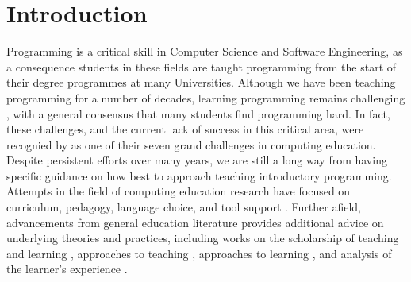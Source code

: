 
\chapter{Introduction} %
\label{cha:introduction}


Programming is a critical skill in Computer Science and Software Engineering, as a consequence students in these fields are taught programming from the start of their degree programmes at many Universities. Although we have been teaching programming for a number of decades, learning programming remains challenging \cite{Jenkins:2002,Lister:2004,McCracken:2001,Ragonis:2007,Robins:2003,Rountree:2002,Renumol:2010,Wiedenbeck:2005}, with a general consensus that many students find programming hard. In fact, these challenges, and the current lack of success in this critical area, were recognied by \citet{McGettrick:2005} as one of their seven grand challenges in computing education. Despite persistent efforts over many years, we are still a long way from having specific guidance on how best to approach teaching introductory programming. Attempts in the field of computing education research have focused on curriculum, pedagogy, language choice, and tool support \cite{Pears:2007}. Further afield, advancements from general education literature provides additional advice on underlying theories and practices, including works on the scholarship of teaching and learning \cite{Boyer:1990}, approaches to teaching \cite{Martin:2000}, approaches to learning \cite{Marton:1976a,Marton:1984,Entwistle:1991,Trigwell:1991,Trigwell:1999}, and analysis of the learner's experience \cite{Marton:1997}. 


